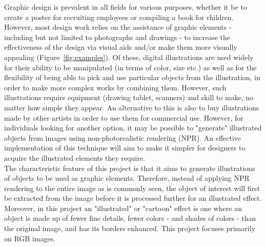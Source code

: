 \documentclass{article}
\begin{document}
Graphic design is prevalent in all fields for various purposes, whether it be to create a poster for recruiting employees or compiling a book for children. However, most design work relies on the assistance of graphic elements -  including but not limited to photographs and drawings - to increase the effectiveness of the design via visual aids and/or make them more visually appealing (Figure~\ref{fig:examples}). Of these, digital illustrations are used widely for their ability to be manipulated (in terms of color, size etc.) as well as for the flexibility of being able to pick and use particular objects from the illustration, in order to make more complex works by combining them. However, such illustrations require equipment (drawing tablet, scanners) and skill to make, no matter how simple they appear. An alternative to this is also to buy illustrations made by other artists in order to use them for commercial use. However, for individuals looking for another option, it may be possible to "generate" illustrated objects from images using non-photorealistic rendering (NPR). An effective implementation of this technique will aim to make it simpler for designers to acquire the illustrated elements they require. \\
The characteristic feature of this project is that it aims to generate illustrations of objects to be used as graphic elements. Therefore, instead of applying NPR rendering to the entire image as is commonly seen, the object of interest will first be extracted from the image before it is processed further for an illustrated effect. Moreover, in this project an "illustrated" or "cartoon" effect is one where an object is made up of fewer fine details, fewer colors - and shades of colors - than the original image, and has its borders enhanced. This project focuses primarily on RGB images.
\end{document}
